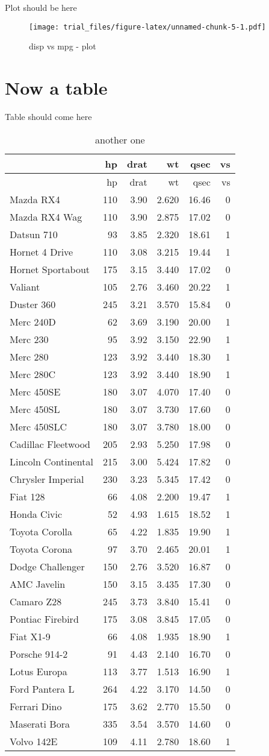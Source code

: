 \documentclass[]{article}
\begin{document}
\lipsum

Plot should be here

\begin{figure}[htbp]
\centering
\texttt{[image: trial\_files/figure-latex/unnamed-chunk-5-1.pdf]}
\caption{disp vs mpg - plot}
\end{figure}

\section{Now a table}\label{now-a-table-3}

\lipsum

Table should come here

\begin{longtable}[]{@{}lrrrrr@{}}
\caption{another one}\tabularnewline
\toprule
& hp & drat & wt & qsec & vs\tabularnewline
\midrule
\endfirsthead
\toprule
& hp & drat & wt & qsec & vs\tabularnewline
\midrule
\endhead
Mazda RX4 & 110 & 3.90 & 2.620 & 16.46 & 0\tabularnewline
Mazda RX4 Wag & 110 & 3.90 & 2.875 & 17.02 & 0\tabularnewline
Datsun 710 & 93 & 3.85 & 2.320 & 18.61 & 1\tabularnewline
Hornet 4 Drive & 110 & 3.08 & 3.215 & 19.44 & 1\tabularnewline
Hornet Sportabout & 175 & 3.15 & 3.440 & 17.02 & 0\tabularnewline
Valiant & 105 & 2.76 & 3.460 & 20.22 & 1\tabularnewline
Duster 360 & 245 & 3.21 & 3.570 & 15.84 & 0\tabularnewline
Merc 240D & 62 & 3.69 & 3.190 & 20.00 & 1\tabularnewline
Merc 230 & 95 & 3.92 & 3.150 & 22.90 & 1\tabularnewline
Merc 280 & 123 & 3.92 & 3.440 & 18.30 & 1\tabularnewline
Merc 280C & 123 & 3.92 & 3.440 & 18.90 & 1\tabularnewline
Merc 450SE & 180 & 3.07 & 4.070 & 17.40 & 0\tabularnewline
Merc 450SL & 180 & 3.07 & 3.730 & 17.60 & 0\tabularnewline
Merc 450SLC & 180 & 3.07 & 3.780 & 18.00 & 0\tabularnewline
Cadillac Fleetwood & 205 & 2.93 & 5.250 & 17.98 & 0\tabularnewline
Lincoln Continental & 215 & 3.00 & 5.424 & 17.82 & 0\tabularnewline
Chrysler Imperial & 230 & 3.23 & 5.345 & 17.42 & 0\tabularnewline
Fiat 128 & 66 & 4.08 & 2.200 & 19.47 & 1\tabularnewline
Honda Civic & 52 & 4.93 & 1.615 & 18.52 & 1\tabularnewline
Toyota Corolla & 65 & 4.22 & 1.835 & 19.90 & 1\tabularnewline
Toyota Corona & 97 & 3.70 & 2.465 & 20.01 & 1\tabularnewline
Dodge Challenger & 150 & 2.76 & 3.520 & 16.87 & 0\tabularnewline
AMC Javelin & 150 & 3.15 & 3.435 & 17.30 & 0\tabularnewline
Camaro Z28 & 245 & 3.73 & 3.840 & 15.41 & 0\tabularnewline
Pontiac Firebird & 175 & 3.08 & 3.845 & 17.05 & 0\tabularnewline
Fiat X1-9 & 66 & 4.08 & 1.935 & 18.90 & 1\tabularnewline
Porsche 914-2 & 91 & 4.43 & 2.140 & 16.70 & 0\tabularnewline
Lotus Europa & 113 & 3.77 & 1.513 & 16.90 & 1\tabularnewline
Ford Pantera L & 264 & 4.22 & 3.170 & 14.50 & 0\tabularnewline
Ferrari Dino & 175 & 3.62 & 2.770 & 15.50 & 0\tabularnewline
Maserati Bora & 335 & 3.54 & 3.570 & 14.60 & 0\tabularnewline
Volvo 142E & 109 & 4.11 & 2.780 & 18.60 & 1\tabularnewline
\bottomrule
\end{longtable}
\end{document}
